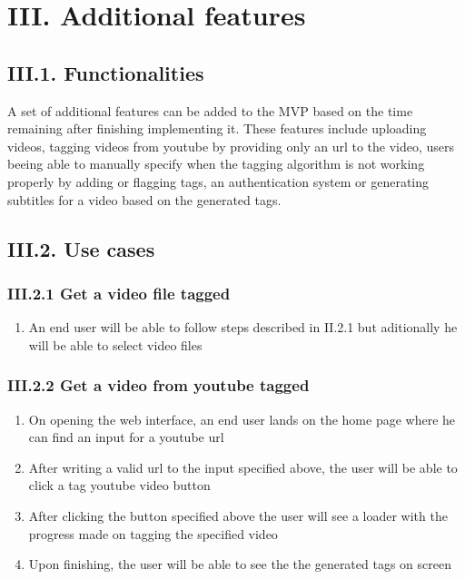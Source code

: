 \documentclass[11pt, a4papper]{report}
\theoremstyle{plain}
\theoremstyle{definition}
\theoremstyle{definition}
\theoremstyle{proposition}
\begin{document}
\chapter*{III. Additional features}

\section*{III.1. Functionalities}
A set of additional features can be added to the MVP based on the time remaining after finishing implementing it. These features include uploading videos, tagging videos from youtube by providing only an url to the video, users beeing able to manually specify when the tagging algorithm is not working properly by adding or flagging tags, an authentication system or generating subtitles for a video based on the generated tags.

\section*{III.2. Use cases}

\subsection*{III.2.1 Get a video file tagged}

\begin{enumerate}
	\item{An end user will be able to follow steps described in II.2.1 but aditionally he will be able to select video files}
\end{enumerate}

\subsection*{III.2.2 Get a video from youtube tagged}

\begin{enumerate}
	\item{On opening the web interface, an end user lands on the home page where he can find an input for a youtube url}
	\item{After writing a valid url to the input specified above, the user will be able to click a tag youtube video button}
	\item{After clicking the button specified above the user will see a loader with the progress made on tagging the specified video}
	\item{Upon finishing, the user will be able to see the the generated tags on screen}
\end{enumerate}
\end{document}
